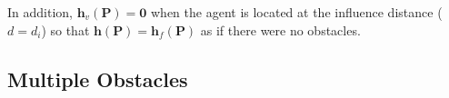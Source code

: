 In addition, $\bm{h}_v(\bm{P}) = \bm{0}$ when the agent is located at the influence distance ($d=d_i$) so that $\bm{h}(\bm{P}) = \bm{h}_f(\bm{P})$ as if there were no obstacles.

\subsection{Multiple Obstacles}

